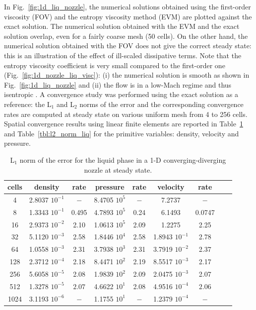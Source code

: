 \documentclass[preprint,10pt]{elsarticle}
\newcommand{\fig}[1]{Fig.~\ref{#1}}                      %
\newcommand{\tbl}[1]{Table~\ref{#1}}                     %
\begin{document}
%
In \fig{fig:1d_liq_nozzle}, the numerical solutions obtained using the first-order viscosity (FOV) and the entropy viscosity method (EVM) are plotted against the exact solution. The numerical solution obtained with the EVM and the exact solution overlap, even for a fairly coarse mesh (50 cells).
On the other hand, the numerical solution obtained with the FOV does not give the correct steady state: this is an illustration of the effect of ill-scaled dissipative terms. 
%
Note that the entropy viscosity coefficient is very small compared to the first-order one (\fig{fig:1d_nozzle_liq_visc}): (i) the numerical solution is smooth as shown in \fig{fig:1d_liq_nozzle} and (ii) the flow is in a low-Mach regime and thus isentropic . A convergence study was performed using the exact solution as a reference: the L$_1$ and L$_2$ norms of the error and the corresponding convergence rates are computed at steady state on various uniform mesh from 4 to 256 cells.
Spatial convergence results using linear finite elements are reported in \tbl{tbl:l1_norm_liq} and \tbl{tbl:l2_norm_liq} for the primitive variables: density, velocity and pressure.
%
\begin{table}[H]
\begin{center}
 \caption{\label{tbl:l1_norm_liq} L$_1$ norm of the error for the liquid phase in a 1-D converging-diverging nozzle at steady state.}
 \begin{tabular}{|c|c|c|c|c|c|c|c|c|}
 \hline
cells & density         & rate   & pressure        & rate    & velocity         & rate     \\ \hline
4    & 2.8037 $10^{-1}$ & $-$    & 8.4705 $10^{5}$ & $-$     & 7.2737           & $-$      \\ \hline
8    & 1.3343 $10^{-1}$ & 0.495 & 4.7893 $10^{5}$ & 0.24 & 6.1493           & 0.0747 \\ \hline
16   & 2.9373 $10^{-2}$ & 2.10 & 1.0613 $10^{5}$ & 2.09  & 1.2275           & 2.25   \\ \hline
32   & 5.1120 $10^{-3}$ & 2.58 & 1.8446 $10^{4}$ & 2.58  & 1.8943 $10^{-1}$ & 2.78   \\ \hline
64   & 1.0558 $10^{-3}$ & 2.31 & 3.7938 $10^{3}$ & 2.31  & 3.7919 $10^{-2}$ & 2.37   \\ \hline
128  & 2.3712 $10^{-4}$ & 2.18 & 8.4471 $10^{2}$ & 2.19  & 8.5517 $10^{-3}$ & 2.17   \\ \hline
256  & 5.6058 $10^{-5}$ & 2.08 & 1.9839 $10^{2}$ & 2.09  & 2.0475 $10^{-3}$ & 2.07   \\ \hline
512  & 1.3278 $10^{-5}$ & $2.07$ & 4.6622 $10^{1}$ & 2.08  & 4.9516 $10^{-4}$ & $2.06$   \\ \hline
1024  & 3.1193 $10^{-6}$ & $-$ & 1.1755 $10^{1}$ & $-$  & 1.2379 $10^{-4}$ & $-$   \\ \hline
\end{tabular}
\end{center}
\end{table}
\end{document}
